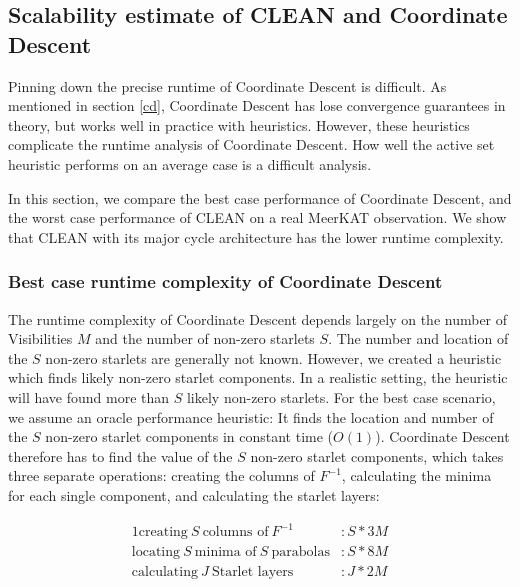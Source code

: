\subsection{Scalability estimate of CLEAN and Coordinate Descent}
Pinning down the precise runtime of Coordinate Descent is difficult. As mentioned in section \ref{cd}, Coordinate Descent has lose convergence guarantees in theory, but works well in practice with heuristics. However, these heuristics complicate the runtime analysis of Coordinate Descent. How well the active set heuristic performs on an average case is a difficult analysis.

In this section, we compare the best case performance of Coordinate Descent, and the worst case performance of CLEAN on a real MeerKAT observation. We show that CLEAN with its major cycle architecture has the lower runtime complexity.

\subsubsection{Best case runtime complexity of Coordinate Descent}
The runtime complexity of Coordinate Descent depends largely on the number of Visibilities $M$ and the number of non-zero starlets $S$. The number and location of the $S$ non-zero starlets are generally not known. However, we created a heuristic which finds likely non-zero starlet components. In a realistic setting, the heuristic will have found more than $S$ likely non-zero starlets. For the best case scenario, we assume an oracle performance heuristic: It finds the location and number of the $S$ non-zero starlet components in constant time ($O(1)$). Coordinate Descent therefore has to find the value of the $S$ non-zero starlet components, which takes three separate operations: creating the columns of $F^{-1}$, calculating the minima for each single component, and calculating the starlet layers:

\begin{alignat*}{1}
\text{creating} \:S\: \text{columns of}\: F^{-1} &: S*3M\\
\text{locating} \:S\: \text{minima of} \:S\: \text{parabolas} &: S*8M\\
\text{calculating} \:J\: \text{Starlet layers} &: J * 2M
\end{alignat*}

